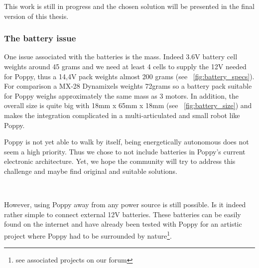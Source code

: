 This work is still in progress and the chosen solution will be presented in the final version of this thesis.


\subsubsection{The battery issue} %

One issue associated with the batteries is the mass. Indeed 3.6V battery cell weights around 45 grams and we need at least 4 cells to supply the 12V needed for Poppy, thus a 14,4V pack weights almost 200 grams (see \figurename~\ref{fig:battery_specs}). For comparison a MX-28 Dynamixels weights 72grams so a battery pack suitable for Poppy weighs approximately the same mass as 3 motors.
In addition, the overall size is quite big with 18mm x 65mm x 18mm (see \figurename~\ref{fig:battery_size}) and makes the integration complicated in a multi-articulated and small robot like Poppy.

Poppy is not yet able to walk by itself, being energetically autonomous does not seem a high priority. Thus we chose to not include batteries in Poppy’s current electronic architecture. Yet, we hope the community will try to address this challenge and maybe find original and suitable solutions.

\begin{figure}[tb]
\centering
    \hfil
    \\
    \caption{}
    \label{fig:tyva_batteries}
\end{figure}

However, using Poppy away from any power source is still possible. Is it indeed rather simple to connect external 12V batteries. These batteries can be easily found on the internet and have already been tested with Poppy for an artistic project where Poppy had to be surrounded by nature\footnote{see associated projects on our forum}.

